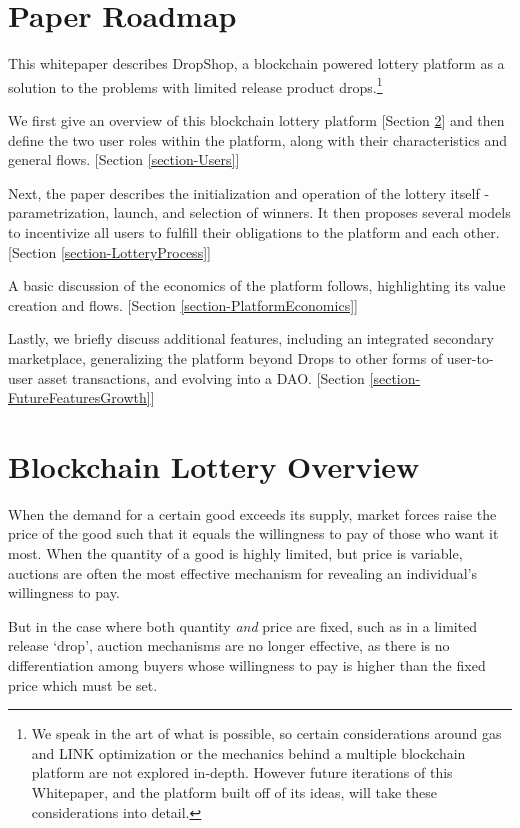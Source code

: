 \documentclass[runningheads]{llncs}
\begin{document}
\section{Paper Roadmap}\label{PaperRoadmap}

This whitepaper describes DropShop, a blockchain powered lottery platform as a solution to the problems with limited release product drops.\footnote{We speak in the art of what is possible, so certain considerations around gas and LINK optimization or the mechanics behind a multiple blockchain platform are not explored in-depth.  However future iterations of this Whitepaper, and the platform built off of its ideas, will take these considerations into detail.}   

We first give an overview of this blockchain lottery platform [Section \ref{section-LotteryOverview}] and then define the two user roles within the platform, along with their characteristics and general flows. [Section \ref{section-Users}]

Next, the paper describes the initialization and operation of the lottery itself -  parametrization, launch, and selection of winners.  It then proposes several models to incentivize all users to fulfill their obligations to the platform and each other.   [Section \ref{section-LotteryProcess}]

A basic discussion of the economics of the platform follows, highlighting its value creation and flows. [Section \ref{section-PlatformEconomics}]  

Lastly, we briefly discuss additional features, including an integrated secondary marketplace, generalizing the platform beyond Drops to other forms of user-to-user asset transactions, and evolving into a DAO.   [Section \ref{section-FutureFeaturesGrowth}]


\section{Blockchain Lottery Overview}\label{section-LotteryOverview}

When the demand for a certain good exceeds its supply, market forces raise the price of the good such that it equals the willingness to pay of those who want it most.  When the quantity of a good is highly limited, but price is variable, auctions are often the most effective mechanism for revealing an individual’s willingness to pay.\cite{17}

But in the case where both quantity \emph{and} price are fixed, such as in a limited release ‘drop’, auction mechanisms are no longer effective, as there is no differentiation among buyers whose willingness to pay is higher than the fixed price which must be set.
\end{document}
